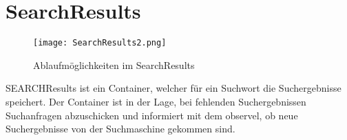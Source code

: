 
\section{SearchResults}
\begin{figure}[htb]
  \texttt{[image: SearchResults2.png]}
  \caption{Ablaufmöglichkeiten im SearchResults}
	\label{fig:Ablaufmöglichkeiten im SearchResults}
\end{figure}

SEARCHResults ist ein Container, welcher für ein Suchwort die Suchergebnisse speichert.
Der Container ist in der Lage, bei fehlenden Suchergebnissen Suchanfragen abzuschicken und informiert mit dem observel, ob neue Suchergebnisse von der Suchmaschine gekommen sind.
